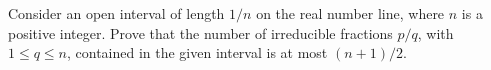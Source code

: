 Consider an open interval of length $1/n$ on the real number line, where $n$ is a positive integer. Prove that the number of irreducible fractions $p/q$,  with $1\le q\le n$,  contained in the given interval is at most $(n+1)/2$.